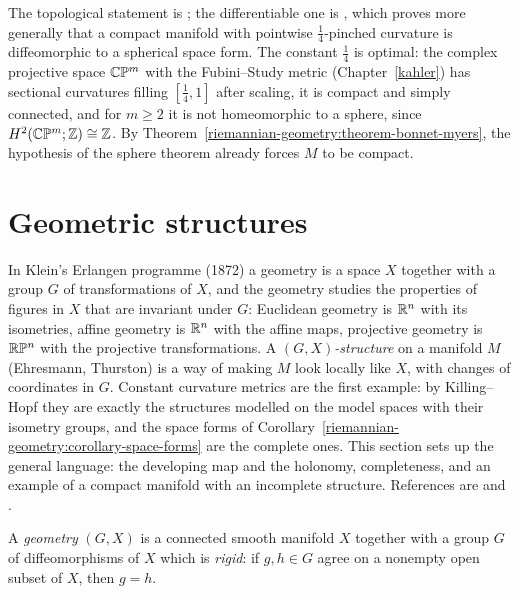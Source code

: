 The topological statement is \cite[Chapter 13]{do-carmo-riemannian}; the differentiable one is \cite{brendle-schoen-2009}, which proves more generally that a compact
manifold with pointwise $\frac14$-pinched curvature is diffeomorphic to a spherical space form. The constant $\frac14$ is optimal: the complex projective space $\mathbb{C}\mathbb{P}^m$
with the Fubini--Study metric (Chapter~\ref{kahler}) has sectional curvatures filling $[\frac14, 1]$ after scaling, it is compact and simply connected, and for $m \geq 2$
it is not homeomorphic to a sphere, since $H^2(\mathbb{C}\mathbb{P}^m; \mathbb{Z}) \cong \mathbb{Z}$. By Theorem~\ref{riemannian-geometry:theorem-bonnet-myers}, the hypothesis of the sphere theorem
already forces $M$ to be compact.

\section{Geometric structures}\label{riemannian-geometry:section-geometric-structures}

In Klein's Erlangen programme (1872) a geometry is a space $X$ together with a group $G$ of transformations of $X$, and the geometry studies the properties of figures in $X$ that are invariant under $G$:
Euclidean geometry is $\mathbb{R}^n$ with its isometries, affine geometry is $\mathbb{R}^n$ with the affine maps, projective geometry is $\mathbb{R}\mathbb{P}^n$ with the projective transformations. A \emph{$(G, X)$-structure} on a manifold
$M$ (Ehresmann, Thurston) is a way of making $M$ look locally like $X$, with changes of coordinates in $G$. Constant curvature metrics are the first example: by Killing--Hopf they are exactly the structures modelled on
the model spaces with their isometry groups, and the space forms of Corollary~\ref{riemannian-geometry:corollary-space-forms} are the complete ones. This section sets up the general language: the developing map and
the holonomy, completeness, and an example of a compact manifold with an incomplete structure. References are \cite[Chapter 3]{thurston-1997} and \cite{goldman-2022}.

\begin{definition}\label{riemannian-geometry:definition-geometry}
A \emph{geometry} $(G, X)$ is a connected smooth manifold $X$ together with a group $G$ of diffeomorphisms of $X$ which is \emph{rigid}: if $g, h \in G$ agree on a nonempty open subset of $X$, then $g = h$.
\end{definition}

